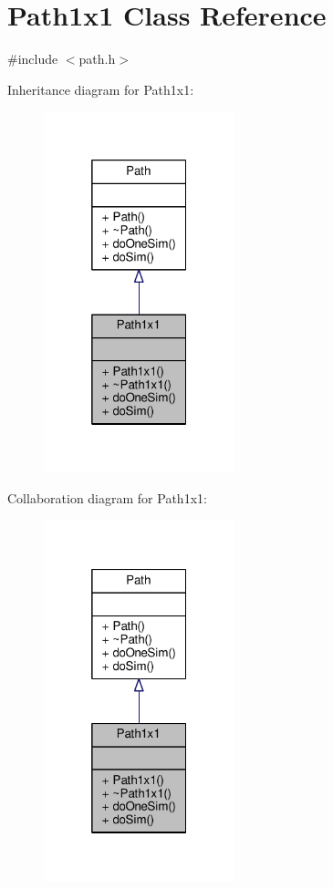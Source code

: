 \hypertarget{classPath1x1}{}\section{Path1x1 Class Reference}
\label{classPath1x1}


{\ttfamily \#include $<$path.\+h$>$}



Inheritance diagram for Path1x1\+:
\nopagebreak
\begin{figure}[H]
\begin{center}
\leavevmode
\includegraphics[width=157pt]{classPath1x1__inherit__graph}
\end{center}
\end{figure}


Collaboration diagram for Path1x1\+:
\nopagebreak
\begin{figure}[H]
\begin{center}
\leavevmode
\includegraphics[width=157pt]{classPath1x1__coll__graph}
\end{center}
\end{figure}
